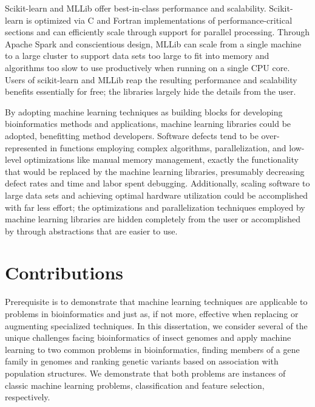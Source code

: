 Scikit-learn and MLLib offer best-in-class performance and scalability.  Scikit-learn is optimized via C and Fortran implementations of performance-critical sections and can efficiently scale through support for parallel processing.  Through Apache Spark and conscientious design, MLLib can scale from a single machine to a large cluster to support data sets too large to fit into memory and algorithms too slow to use productively when running on a single CPU core. Users of scikit-learn and MLLib reap the resulting performance and scalability benefits essentially for free; the libraries largely hide the details from the user.

By adopting machine learning techniques as building blocks for developing bioinformatics methods and applications, machine learning libraries could be adopted, benefitting method developers. Software defects tend to be over-represented in functions employing complex algorithms, parallelization, and low-level optimizations like manual memory management, exactly the functionality that would be replaced by the machine learning libraries, presumably decreasing defect rates and time and labor spent debugging. Additionally, scaling software to large data sets and achieving optimal hardware utilization could be accomplished with far less effort; the optimizations and parallelization techniques employed by machine learning libraries are hidden completely from the user or accomplished by through abstractions that are easier to use.

\section{Contributions}
Prerequisite is to demonstrate that machine learning techniques are applicable to problems in bioinformatics and just as, if not more, effective when replacing or augmenting specialized techniques.  In this dissertation, we consider several of the unique challenges facing bioinformatics of insect genomes and apply machine learning to two common problems in bioinformatics, finding members of a gene family in genomes and ranking genetic variants based on association with population structures.  We demonstrate that both problems are instances of classic machine learning problems, classification and feature selection, respectively.

